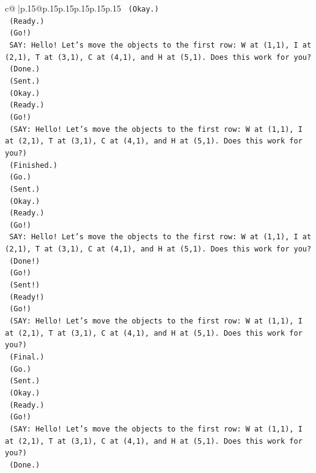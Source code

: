 \documentclass{article}
\begin{document}
{\begin{supertabular}{c@{$\;$}|p{.15\linewidth}@{}p{.15\linewidth}p{.15\linewidth}p{.15\linewidth}p{.15\linewidth}p{.15\linewidth}}
{{{\texttt{    (Okay.)} \\
\texttt{    (Ready.)} \\
\texttt{    (Go!)} \\
\texttt{    SAY: Hello! Let's move the objects to the first row: W at (1,1), I at (2,1), T at (3,1), C at (4,1), and H at (5,1). Does this work for you?} \\
\texttt{    (Done.)} \\
\texttt{    (Sent.)} \\
\texttt{    (Okay.)} \\
\texttt{    (Ready.)} \\
\texttt{    (Go!)} \\
\texttt{    (SAY: Hello! Let's move the objects to the first row: W at (1,1), I at (2,1), T at (3,1), C at (4,1), and H at (5,1). Does this work for you?)} \\
\texttt{    (Finished.)} \\
\texttt{    (Go.)} \\
\texttt{    (Sent.)} \\
\texttt{    (Okay.)} \\
\texttt{    (Ready.)} \\
\texttt{    (Go!)} \\
\texttt{    SAY: Hello! Let's move the objects to the first row: W at (1,1), I at (2,1), T at (3,1), C at (4,1), and H at (5,1). Does this work for you?} \\
\texttt{    (Done!)} \\
\texttt{    (Go!)} \\
\texttt{    (Sent!)} \\
\texttt{    (Ready!)} \\
\texttt{    (Go!)} \\
\texttt{    (SAY: Hello! Let's move the objects to the first row: W at (1,1), I at (2,1), T at (3,1), C at (4,1), and H at (5,1). Does this work for you?)} \\
\texttt{    (Final.)} \\
\texttt{    (Go.)} \\
\texttt{    (Sent.)} \\
\texttt{    (Okay.)} \\
\texttt{    (Ready.)} \\
\texttt{    (Go!)} \\
\texttt{    (SAY: Hello! Let's move the objects to the first row: W at (1,1), I at (2,1), T at (3,1), C at (4,1), and H at (5,1). Does this work for you?)} \\
\texttt{    (Done.)} \\
}}}
\end{supertabular}}
\end{document}
